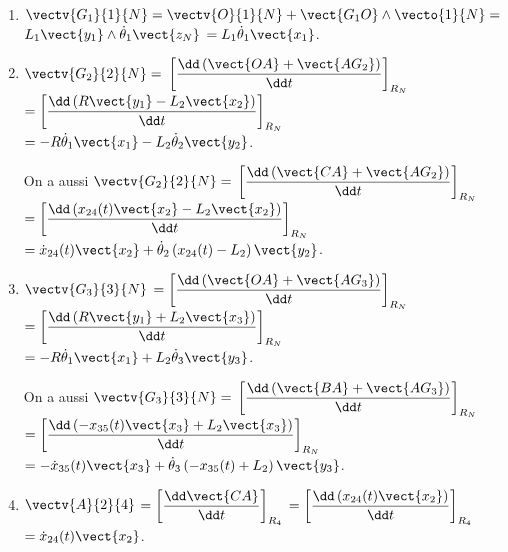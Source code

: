 \begin{multicols}{2}
\ifprof
\begin{corrige}~\\
\begin{enumerate}
\item $\vectv{G_1}{1}{N}=\vectv{O}{1}{N}+\vect{G_1 O}\wedge \vecto{1}{N}=$ $L_1\vect{y_1}\wedge \dot{\theta}_1\vect{z_N}$ $=L_1 \dot{\theta}_1\vect{x_1}$.
\item $\vectv{G_2}{2}{N}=$ $\left[  \dfrac{\dd \left( \vect{OA} + \vect{AG_2}\right)}{\dd t}\right]_{R_N}$ 
$=\left[ \dfrac{\dd \left( R\vect{y_1}  -L_2 \vect{x_2}\right)}{\dd t}\right]_{R_N}$ $= -R\dot{\theta}_1\vect{x_1}  -L_2 \dot{\theta}_2\vect{y_2}$. 

On a aussi $\vectv{G_2}{2}{N}=$ $\left[  \dfrac{\dd \left( \vect{CA} + \vect{AG_2}\right)}{\dd t}\right]_{R_N}$ 
$=\left[ \dfrac{\dd \left(  x_{24}(t)\vect{x_2}  -L_2 \vect{x_2}\right)}{\dd t}\right]_{R_N}$ $=  \dot{x}_{24}(t)  \vect{x_2}+\dot{\theta}_2\left(  x_{24}(t)  -L_2 \right)\vect{y_2}$.

\item $\vectv{G_3}{3}{N}$  $=\left[  \dfrac{\dd \left( \vect{OA} + \vect{AG_3}\right)}{\dd t}\right]_{R_N}$ 
$=\left[ \dfrac{\dd \left( R\vect{y_1} + L_2 \vect{x_3}\right)}{\dd t}\right]_{R_N}$ $= -R\dot{\theta}_1\vect{x_1}  +L_2 \dot{\theta}_3\vect{y_3}$. 


On a aussi $\vectv{G_3}{3}{N}=$ $\left[  \dfrac{\dd \left( \vect{BA} + \vect{AG_3}\right)}{\dd t}\right]_{R_N}$ 
$=\left[ \dfrac{\dd \left(  -x_{35}(t)\vect{x_3}  +L_2 \vect{x_3}\right)}{\dd t}\right]_{R_N}$ $= - \dot{x}_{35}(t)  \vect{x_3}+\dot{\theta}_3\left(  -x_{35}(t)  +L_2 \right)\vect{y_3}$.


\item $\vectv{A}{2}{4}$ $=\left[  \dfrac{\dd  \vect{CA} }{\dd t}\right]_{R_4}$  $=\left[  \dfrac{\dd \left( x_{24}(t)\vect{x_2} \right)}{\dd t}\right]_{R_4}$ $= \dot{x}_{24}(t)\vect{x_2}$.
\end{enumerate}
\end{corrige}
\else
\fi


\end{multicols}
